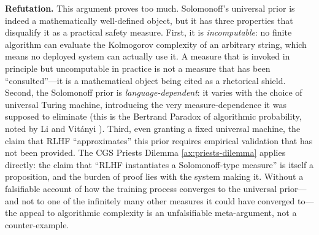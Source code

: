 \documentclass[11pt,a4paper]{article}
\theoremstyle{definition}
\theoremstyle{plain}
\theoremstyle{remark}
\begin{document}
\textbf{Refutation.}
This argument proves too much.  Solomonoff's universal prior \cite{solomonoff1964} is indeed
a mathematically well-defined object, but it has three properties that disqualify it as a
practical safety measure.
First, it is \emph{incomputable}: no finite algorithm can evaluate the Kolmogorov
complexity of an arbitrary string, which means no deployed system can actually use it.
A measure that is invoked in principle but uncomputable in practice is not a measure that
has been ``consulted''---it is a mathematical object being cited as a rhetorical shield.
Second, the Solomonoff prior is \emph{language-dependent}: it varies with the choice of
universal Turing machine, introducing the very measure-dependence it was supposed to
eliminate (this is the Bertrand Paradox of algorithmic probability, noted by
Li and Vit\'{a}nyi \cite{li2008}).
Third, even granting a fixed universal machine, the claim that RLHF ``approximates''
this prior requires empirical validation that has not been provided.
The CGS Priests Dilemma \cref{ax:priests-dilemma} applies directly: the claim that ``RLHF
instantiates a Solomonoff-type measure'' is itself a proposition, and the burden of proof
lies with the system making it.  Without a falsifiable account of how the training process
converges to the universal prior---and not to one of the infinitely many other measures
it could have converged to---the appeal to algorithmic complexity is an unfalsifiable
meta-argument, not a counter-example.
\end{document}
